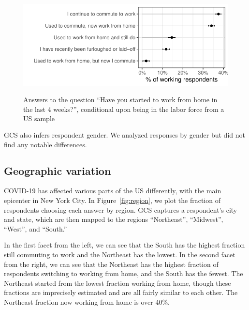 \documentclass[12pt]{article}
\begin{document}
\begin{figure}
  \caption{Answers to the question ``Have you started to work from home in the last 4 weeks?'', conditional upon being in the labor force from a US sample} \label{fig:working_summary}
\centering
\begin{minipage}{1.1 \linewidth}
  \includegraphics[width = \linewidth]{plots/working_summary.pdf} \\
  \begin{footnotesize}
    \end{footnotesize}
\end{minipage}
\end{figure} 

GCS also infers respondent gender.
We analyzed responses by gender but did not find any notable differences.

\subsection{Geographic variation} 
COVID-19 has affected various parts of the US differently, with the main epicenter in New York City.
In Figure~\ref{fig:region}, we plot the fraction of respondents choosing each answer by region.
GCS captures a respondent's city and state, which are then mapped to the regions ``Northeast'', ``Midwest'', ``West'', and ``South.'' 

In the first facet from the left, we can see that the South has the highest fraction still commuting to work and the Northeast has the lowest. 
In the second facet from the right, we can see that the Northeast has the highest fraction of respondents switching to working from home, and the South has the fewest.
The Northeast started from the lowest fraction working from home, though these fractions are imprecisely estimated and are all fairly similar to each other. 
The Northeast fraction now working from home is over 40\%. 
\end{document}
